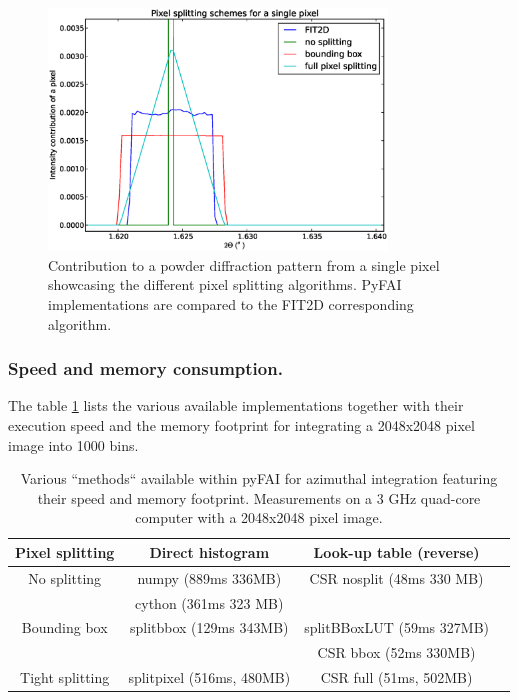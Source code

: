 \documentclass{iucr}
\begin{document}
\begin{figure}
\label{split}
\begin{center}
\includegraphics[width=9cm]{splitpixel.eps}
\caption{Contribution to a powder diffraction pattern from a single pixel
showcasing the different pixel splitting algorithms. PyFAI implementations are
compared to the FIT2D corresponding algorithm.}
\end{center}
\end{figure}

\subsubsection{Speed and memory consumption.}

The table \ref{table_methods}  lists the various available implementations
together with their execution speed and the memory footprint for integrating a 2048x2048
pixel image into 1000 bins.

\begin{table}
\label{table_methods}
\caption{Various ``methods`` available within pyFAI for azimuthal integration
featuring their speed and memory footprint. Measurements on a 3 GHz quad-core
computer with a 2048x2048 pixel image.}
\begin{tabular}[pos]{c|c|c|c}
Pixel splitting			& Direct histogram 		& Look-up table (reverse) \\
\hline
No splitting          & numpy (889ms 336MB)  &CSR nosplit (48ms 330 MB)\\ 
					  & cython (361ms 323 MB) & \\
\hline
Bounding box          & splitbbox (129ms 343MB) & splitBBoxLUT (59ms 327MB)\\
					&						&	CSR bbox (52ms 330MB) \\
\hline
Tight splitting & splitpixel (516ms, 480MB) &CSR full (51ms, 502MB)\\
\end{tabular}
\end{table}
\end{document}
